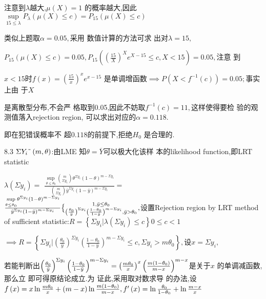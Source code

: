 \documentclass{ctexart}
\def\QATOPD#1#2#3#4{{#3 \atopwithdelims#1#2 #4}}%
\begin{document}
注意到$\lambda $越大,$\mu \left( X\right) =1$%
的概率越大,因此$\underset{15\leq
\lambda }{\sup }P_{\lambda }\left( \mu \left( X\right) \leq c\right)
=P_{15}\left( \mu \left( X\right) \leq c\right) $

类似上题取$\alpha =0.05,$采用%
数值计算的方法可求%
出对$\lambda =15,$

$P_{15}\left( \mu \left( X\right) \leq c\right) =0.05,P_{15}\left( \left( 
\frac{15}{X}\right) ^{X}e^{X-15}\leq c,X<15\right) =0.05,$注意%
到

$x<15$时$f\left( x\right) =\left( \frac{15}{x}\right) ^{x}e^{x-15}$%
是单调增函数$\implies P\left(
X<f^{-1}\left( c\right) \right) =0.05;$事实上由%
于$X$

是离散型分布,不会严%
格取到0.05,因此不妨取$%
f^{-1}\left( c\right) =11,$这样使得要检%
验的观测值落入rejection region,%
可以求出对应的$\alpha =0.118.$

\bigskip 即在犯错误概率不%
超$0.118$的前提下,拒绝$H_{0}$%
是合理的.

8.3 $\Sigma Y_{i}\symbol{126}\left( m,\theta \right) $:由LME 知$%
\theta =\overline{Y}$可以极大化该样%
本的likelihood function,即LRT statistic

$\lambda \left( \Sigma y_{i}\right) =$ $\frac{\underset{\theta \leq \theta
_{0}}{\sup }\binom{m}{\Sigma y_{i}}\theta ^{\Sigma y_{i}}\left( 1-\theta
\right) ^{m-\Sigma y_{i}}}{\binom{m}{\Sigma y_{i}}\bar{y}^{\Sigma
y_{i}}\left( 1-\bar{y}\right) ^{m-\Sigma y_{i}}}=$ $\frac{\underset{\theta
\leq \theta _{0}}{\sup }\theta ^{\Sigma y_{i}}\left( 1-\theta \right)
^{m-\Sigma y_{i}}}{\bar{y}^{\Sigma y_{i}}\left( 1-\bar{y}\right) ^{m-\Sigma
y_{i}}}\QATOPD\{ . {1,\bar{y}\leq \theta _{0}}{\left( \frac{\theta _{0}}{%
\bar{y}}\right) ^{\Sigma y_{i}}\left( \frac{1-\theta _{0}}{1-\bar{y}}\right)
^{m-\Sigma y_{i}},\bar{y}>\theta _{0}},$设置Rejection region by
LRT method of sufficient statistic:$R=\left\{ \Sigma y_{i}|\lambda \left(
\Sigma y_{i}\right) \leq c\right\} 0\leq c<1$

$\implies R=\left\{ \Sigma y_{i}|\left( \frac{\theta _{0}}{\bar{y}}\right)
^{\Sigma y_{i}}\left( \frac{1-\theta _{0}}{1-\bar{y}}\right) ^{m-\Sigma
y_{i}}\leq c,\Sigma y_{i}>m\theta _{0}\right\} ,$设$x=\Sigma y_{i},$

若能判断出$\left( \frac{\theta _{0}}{\bar{y}}%
\right) ^{\Sigma y_{i}}\left( \frac{1-\theta _{0}}{1-\bar{y}}\right)
^{m-\Sigma y_{i}}=\left( \frac{m\theta _{0}}{x}\right) ^{x}\left( \frac{%
m\left( 1-\theta _{0}\right) }{m-x}\right) ^{m-x}$是关于$x$%
的单调减函数,那么立%
即可得原结论成立.为%
证此,采用取对数求导%
的办法,设$f\left( x\right) =x\ln \frac{m\theta _{0}}{%
x}+\left( m-x\right) \ln \frac{m\left( 1-\theta _{0}\right) }{m-x},f^{\prime
}\left( x\right) =\ln \frac{\theta _{0}}{1-\theta _{0}}+\ln \frac{m-x}{x}$
\end{document}
